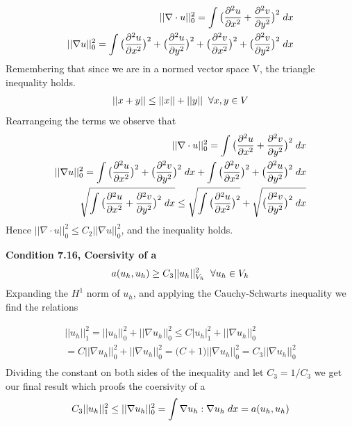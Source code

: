 \documentclass[a4paper,norsk]{article}
\begin{document}
\begin{align*}
 ||\nabla \cdot u||_0^2 = \int \big(\frac{\partial^2 u}{\partial x^2} + \frac{\partial^2 v}{\partial y^2}\big)^2 \hspace{1mm} dx \\
 ||\nabla u||_0^2 = \int \big(\frac{\partial^2 u}{\partial x^2}\big)^2 + \big(\frac{\partial^2 u}{\partial y^2} \big)^2 +
 \big(\frac{\partial^2 v}{\partial x^2} \big)^2 + \big( \frac{\partial^2 v}{\partial y^2} \big)^2 \hspace{1mm} dx
\end{align*}
Remembering that since we are in a normed vector space V, the triangle inequality holds.
\begin{align*}
||x + y || \leq ||x|| + ||y|| \hspace{2mm} \forall x,y \in V
\end{align*}
Rearrangeing the terms we observe that
\begin{align*}
 ||\nabla \cdot u||_0^2 = \int \big(\frac{\partial^2 u}{\partial x^2} + \frac{\partial^2 v}{\partial y^2}\big)^2 \hspace{1mm} dx \\
 ||\nabla u||_0^2 = \int \big(\frac{\partial^2 u}{\partial x^2}\big)^2
 +  \big( \frac{\partial^2 v}{\partial y^2} \big)^2 \hspace{1mm} dx
 + \int \big(\frac{\partial^2 v}{\partial x^2} \big)^2 +
  \big(\frac{\partial^2 u}{\partial y^2} \big)^2  \hspace{1mm} dx \\
  \sqrt{ \int \big(\frac{\partial^2 u}{\partial x^2} + \frac{\partial^2 v}{\partial y^2}\big)^2 \hspace{1mm} dx }\leq
 \sqrt{ \int \big(\frac{\partial^2 u}{\partial x^2}\big)^2}
 + \sqrt{ \big( \frac{\partial^2 v}{\partial y^2} \big)^2 \hspace{1mm} dx }
\end{align*}
Hence $||\nabla \cdot u||_0^2 \leq C_2 ||\nabla u ||_0^2$, and the inequality holds.

\textbf{Condition 7.16, Coersivity of a}
\begin{align*}
 a(u_h, u_h) \geq C_3 ||u_h||_{V_h}^2 \hspace{2mm} \forall u_h \in V_h
\end{align*}
Expanding the $H^1$ norm of $u_h$, and applying the Cauchy-Schwarts inequality we find the relations

\begin{align*}
||u_h||_1^2 = ||u_h||_0^2 + ||\nabla u_h||_0^2 \leq C|u_h|_1^2 + ||\nabla u_h||_0^2 \\
= C||\nabla u_h||_0^2 + ||\nabla u_h||_0^2 = \big(C + 1\big)||\nabla u_h||_0^2 = C_3 ||\nabla u_h||_0^2 \\
\end{align*}
Dividing the constant on both sides of the inequality and let $C_3 = 1/C_3$ we get our final result which proofs the coersivity of a
\begin{align*}
C_3||u_h||_1^2 \leq ||\nabla u_h||_0^2 = \int \nabla u_h : \nabla u_h \hspace{1mm} dx = a(u_h, u_h)
\end{align*}
\end{document}
